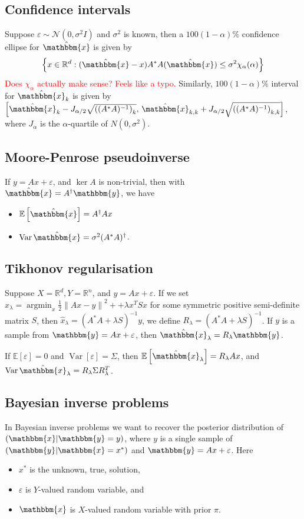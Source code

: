 \documentclass[12pt]{article}
\theoremstyle{definition}
\newcommand{\real}{\mathbb{R}}   %
\newcommand{\set}[1]{\left\{#1\right\}}
\DeclareMathOperator{\argmin}{argmin}
\DeclareMathOperator{\var}{Var}
\newcommand{\E}[1]{\mathbb{E} \left[#1\right]}
\newcommand\norm[1]{\left\lVert#1\right\rVert}
\begin{document}
\subsection{Confidence intervals}
Suppose $\varepsilon\sim \mathcal{N}(0,\sigma^2 I)$ and $\sigma^2$ is known, then a $100(1-\alpha)\%$ confidence ellipse for $\hat{\mathbbm{x}}$ is given by
\begin{equation*}
    \set{x\in\real^d: (\hat{\mathbbm{x}} - x)A^*A(\hat{\mathbbm{x}}) \leq \sigma^2\chi_\alpha(\alpha)}
\end{equation*}
\textcolor{red}{Does $\chi_\alpha$ actually make sense? Feels like a typo.} 
Similarly, $100(1-\alpha)\%$ interval for $\hat{\mathbbm{x}}_k$ is given by $\left[\hat{\mathbbm{x}}_k - J_{\alpha/2}\sqrt{\left((A^*A)^{-1}\right)_k},\, \hat{\mathbbm{x}}_{k,k} + J_{\alpha/2}\sqrt{\left((A^*A)^{-1}\right)_{k,k}}\right]$, where $J_{\alpha}$ is the $\alpha$-quartile of $N(0,\sigma^2)$.

\subsection{Moore-Penrose pseudoinverse}
If $y = Ax + \varepsilon$, and $\ker A$ is non-trivial, then with $\hat{\mathbbm{x}} = A^\dagger {\mathbbm{y}}$, we have 
\begin{itemize}
    \item $\E{\hat{\mathbbm{x}}} = A^\dagger A x$
    \item $\var {\hat{\mathbbm{x}}} = \sigma^2 (A^*A)^\dagger$.
\end{itemize}

\subsection{Tikhonov regularisation}
Suppose $X= \real^d, Y= \real^n$, and $y= Ax+\varepsilon$. If we set $\hat{x}_\lambda = \argmin_x \frac{1}{2}\norm{Ax-y}^2 + + \lambda x^TSx$ for some symmetric positive semi-definite matrix $S$, then $\hat{x}_\lambda = (A^*A + \lambda S)^{-1}y$, we define $R_\lambda = (A^*A + \lambda S)^{-1}$. If $y$ is a sample from $\mathbbm{y} = Ax + \varepsilon$, then $\hat{\mathbbm{x}}_\lambda = R_\lambda \mathbbm{y}$. 

If $\E{\varepsilon} = 0$ and $\var [\varepsilon] = \Sigma$, then $\E{\hat{\mathbbm{x}}_\lambda} = R_\lambda Ax$, and $\var\hat{\mathbbm{x}}_\lambda = R_\lambda \Sigma R_\lambda^T$.

\subsection{Bayesian inverse problems}
In Bayesian inverse problems we want to recover the posterior distribution of $(\mathbbm{x}|\mathbbm{y}=y)$, where $y$ is a single sample of $(\mathbbm{y}|\mathbbm{x}=x^*)$ and $\mathbbm{y}=Ax + \varepsilon$. Here
\begin{itemize}
    \item $x^*$ is the unknown, true, solution,
    \item $\varepsilon$ is $Y$-valued random variable, and
    \item $\mathbbm{x}$ is $X$-valued random variable with prior $\pi$.
\end{itemize}
\end{document}
